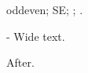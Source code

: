\documentclass{article}
\newlength{\overhang}\setlength{\overhang}{2cm}
\begin{document}
\makeatletter
\checkoddpage\ifcpoddpage odd\else even\fi; \ifcpstrict S\else E\fi; \the\c@cp@tempcnt; \thecp@cnt.
\makeatother
\begin{adjustwidth}[]{}{-\overhang}
Wide text.
\end{adjustwidth}
After.
\end{document}
